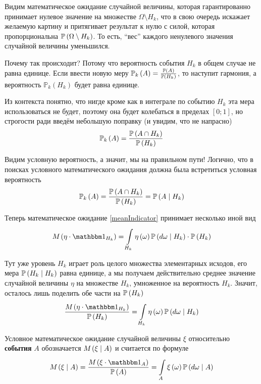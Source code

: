 Видим математическое ожидание случайной величины,
которая гарантированно принимает нулевое значение
на множестве $\Omega \setminus H_k$,
что в свою очередь искажает желаемую картину и притягивает результат к нулю
с силой, которая пропорциональна $\mathbb{P}\left( \Omega \setminus H_k \right)$.
То есть, ``вес'' каждого ненулевого значения случайной величины уменьшился.

Почему так происходит?
Потому что вероятность события $H_k$ в общем случае не равна единице.
Если ввести новую меру
$\mathbb{P}_k\left( A \right)=\frac{\mathbb{P}\left( A \right)}{\mathbb{P}\left( H_k \right)}$,
то наступит гармония, а
вероятность $\mathbb{P}_k\left( H_k \right)$ будет равна единице.

Из контекста понятно, что нигде кроме как в интеграле по событию $H_k$ эта
мера использоваться не будет,
поэтому она будет колебаться в пределах $\left[ 0;1 \right]$,
но строгости ради введём небольшую поправку (и увидим, что не напрасно)
$$\mathbb{P}_k\left( A \right)
    =\frac{\mathbb{P}\left( A\cap H_k \right)}{\mathbb{P}\left( H_k \right)}$$

Видим условную вероятность, а значит, мы на правильном пути!
Логично, что в поисках условного математического ожидания
должна была встретиться условная вероятность
$$\mathbb{P}_k\left( A \right)
    =\frac{\mathbb{P}\left( A\cap H_k \right)}{\mathbb{P}\left( H_k \right)}
    =\mathbb{P}\left( A \mid H_k \right)$$

Теперь математическое ожидание \eqref{meanIndicator}
принимает несколько иной вид
$$\mean{\left( \eta \cdot \indicatorof{H_k} \right)}
        =\integralc{H_k}{}{}{\probability{d\omega \mid H_k}}{
            \eta\left( \omega \right)} \cdot \probability{H_k}$$

Тут уже уровень $H_k$ играет роль целого множества элементарных исходов,
его мера $\mathbb{P}\left( H_k \mid H_k \right)$ равна единице,
а мы получаем действительно среднее значение случайной величины $\eta$
на множестве $H_k$, умноженное на вероятность $H_k$.
Значит, осталось лишь поделить обе части на $\mathbb{P}\left( H_k \right)$
$$\frac{\mean{\left( \eta \cdot \indicatorof{H_k} \right)}}{\probability{H_k}}
        =\integralc{H_k}{}{}{\probability{d\omega \mid H_k}}{
            \eta\left( \omega \right)}$$

\begin{definition}
Условное математическое
ожидание случайной величины $\xi$
относительно \textbf{события} $A$ \cite[стр.~68]{BorovkovPT}
обозначается $M_{} \left( \xi \mid A \right)$ и считается по формуле
$$\mean{\left( \xi \mid A \right)}
    =\frac{\mean{\left( \xi \cdot \indicatorof{A} \right)}}{\probability{A}}
        =\integralc{A}{}{}{\probability{d\omega \mid A}}{
            \xi\left( \omega \right)}$$
\end{definition}

